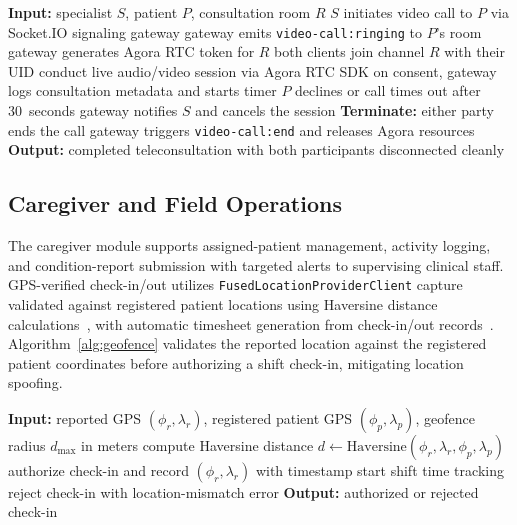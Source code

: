 \documentclass[conference]{IEEEtran}
\begin{document}
\begin{algorithm}[htbp]
\caption{Teleconsultation session management.}
\label{alg:tele}
\begin{algorithmic}[1]
\STATE \textbf{Input:} specialist $S$, patient $P$, consultation room $R$
\STATE $S$ initiates video call to $P$ via Socket.IO signaling gateway
\STATE gateway emits \texttt{video-call:ringing} to $P$'s room
  \STATE gateway generates Agora RTC token for $R$ 
  \STATE both clients join channel $R$ with their UID
  \STATE conduct live audio/video session via Agora RTC SDK
  \STATE on consent, gateway logs consultation metadata and starts timer
\ELSE
  \STATE $P$ declines or call times out after 30~seconds
  \STATE gateway notifies $S$ and cancels the session
\ENDIF
\STATE \textbf{Terminate:} either party ends the call
\STATE gateway triggers \texttt{video-call:end} and releases Agora resources
\STATE \textbf{Output:} completed teleconsultation with both participants disconnected cleanly
\end{algorithmic}
\end{algorithm}

\FloatBarrier

\subsection{Caregiver and Field Operations}
The caregiver module supports assigned-patient management, activity logging, and condition-report submission with targeted alerts to supervising clinical staff. GPS-verified check-in/out utilizes \texttt{FusedLocationProviderClient} capture validated against registered patient locations using Haversine distance calculations~, with automatic timesheet generation from check-in/out records~\cite{zandbergen2009accuracy}. Algorithm~\ref{alg:geofence} validates the reported location against the registered patient coordinates before authorizing a shift check-in, mitigating location spoofing.

\begin{algorithm}[htbp]
\caption{GPS-verified caregiver check-in validation.}
\label{alg:geofence}
\begin{algorithmic}[1]
\STATE \textbf{Input:} reported GPS $(\phi_r,\lambda_r)$, registered patient GPS $(\phi_p,\lambda_p)$, geofence radius $d_{\max}$ in meters
\STATE compute Haversine distance $d \leftarrow \text{Haversine}(\phi_r,\lambda_r,\phi_p,\lambda_p)$
  \STATE authorize check-in and record $(\phi_r,\lambda_r)$ with timestamp
  \STATE start shift time tracking
\ELSE
  \STATE reject check-in with location-mismatch error
\ENDIF
\STATE \textbf{Output:} authorized or rejected check-in
\end{algorithmic}
\end{algorithm}
\end{document}
